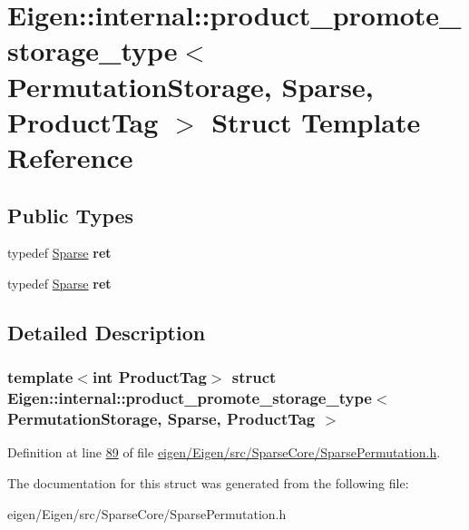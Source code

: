 \hypertarget{struct_eigen_1_1internal_1_1product__promote__storage__type_3_01_permutation_storage_00_01_sparse_00_01_product_tag_01_4}{}\section{Eigen\+:\+:internal\+:\+:product\+\_\+promote\+\_\+storage\+\_\+type$<$ Permutation\+Storage, Sparse, Product\+Tag $>$ Struct Template Reference}
\label{struct_eigen_1_1internal_1_1product__promote__storage__type_3_01_permutation_storage_00_01_sparse_00_01_product_tag_01_4}
\subsection*{Public Types}
\begin{DoxyCompactItemize}
\item 
\mbox{\label{struct_eigen_1_1internal_1_1product__promote__storage__type_3_01_permutation_storage_00_01_sparse_00_01_product_tag_01_4_affeea42c7eafb00d21e67bc7c26a2014}} 
typedef \hyperlink{struct_eigen_1_1_sparse}{Sparse} {\bfseries ret}
\item 
\mbox{\label{struct_eigen_1_1internal_1_1product__promote__storage__type_3_01_permutation_storage_00_01_sparse_00_01_product_tag_01_4_affeea42c7eafb00d21e67bc7c26a2014}} 
typedef \hyperlink{struct_eigen_1_1_sparse}{Sparse} {\bfseries ret}
\end{DoxyCompactItemize}


\subsection{Detailed Description}
\subsubsection*{template$<$int Product\+Tag$>$\newline
struct Eigen\+::internal\+::product\+\_\+promote\+\_\+storage\+\_\+type$<$ Permutation\+Storage, Sparse, Product\+Tag $>$}



Definition at line \hyperlink{eigen_2_eigen_2src_2_sparse_core_2_sparse_permutation_8h_source_l00089}{89} of file \hyperlink{eigen_2_eigen_2src_2_sparse_core_2_sparse_permutation_8h_source}{eigen/\+Eigen/src/\+Sparse\+Core/\+Sparse\+Permutation.\+h}.



The documentation for this struct was generated from the following file\+:\begin{DoxyCompactItemize}
\item 
eigen/\+Eigen/src/\+Sparse\+Core/\+Sparse\+Permutation.\+h\end{DoxyCompactItemize}
